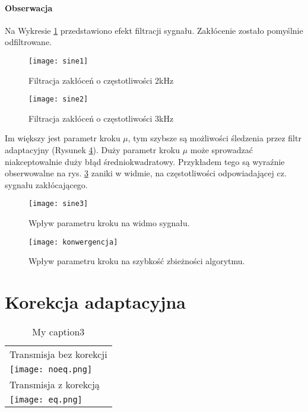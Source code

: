 \paragraph{Obserwacja}
Na Wykresie \ref{fig:sine1} przedstawiono efekt filtracji sygnału.
Zakłócenie zostało pomyślnie odfiltrowane.

\begin{figure}[h]
\centering
\texttt{[image: sine1]}
\caption{Filtracja zakłóceń o częstotliwości 2kHz}
\label{fig:sine1}
\end{figure}

\begin{figure}[h]
\centering
\texttt{[image: sine2]}
\caption{Filtracja zakłóceń o częstotliwości 3kHz}
\label{fig:sine2}
\end{figure}

Im większy jest parametr kroku $\mu$, tym szybsze są możliwości śledzenia przez filtr adaptacyjny (Rysunek \ref{fig:sine4}). Duży parametr kroku $\mu$ może sprowadzać niakceptowalnie duży błąd średniokwadratowy. \cite{Haykin:1998:ST} 
Przykładem tego są wyraźnie obserwowalne na rys. \ref{fig:sine3} zaniki w widmie, na częstotliwości odpowiadającej cz. sygnału zakłócającego.

\begin{figure}[h]
\centering
\texttt{[image: sine3]}
\caption{Wpływ parametru kroku na widmo sygnału.}
\label{fig:sine3}
\end{figure}

\begin{figure}[h]
\centering
\texttt{[image: konwergencja]}
\caption{Wpływ parametru kroku na szybkość zbieżności algorytmu.}
\label{fig:sine4}
\end{figure}

\section{Korekcja adaptacyjna}

\begin{sidewaystable}[t]
\centering
\caption{My caption3}
\label{my-label3}
\begin{tabular}{l}
\hline
Transmisja bez korekcji \\
\texttt{[image: noeq.png]}\\ \hline
Transmisja z korekcją   \\
\texttt{[image: eq.png]}\\
\end{tabular}
\end{sidewaystable}

